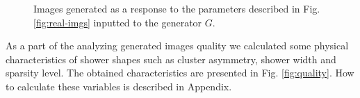 \documentclass{webofc}
\begin{document}
\begin{figure}[h]
  \centering
  \caption{Images generated as a response to the parameters described in Fig. \ref{fig:real-imgs} inputted to the generator $G$. }
  \label{fig:gen-img}
\end{figure}

As a part of the analyzing generated images quality we calculated some physical characteristics of shower shapes such as cluster asymmetry, shower width and sparsity level. The obtained characteristics are presented in Fig. \ref{fig:quality}. How to calculate these variables is described in Appendix.
\end{document}
